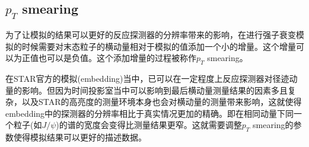 \subsection{ \textbf{$p_T$ smearing} }

为了让模拟的结果可以更好的反应探测器的分辨率带来的影响，在进行强子衰变模拟的时候需要对末态粒子的横动量相对于模拟的值添加一个小的增量。这个增量可以为正值也可以是负值。这个添加增量的过程被称作$p_T$ smearing。

在STAR官方的模拟(embedding)当中，已可以在一定程度上反应探测器对径迹动量的影响。但因为时间投影室当中可以影响到最后横动量测量结果的因素多且复杂，以及STAR的高亮度的测量环境本身也会对横动量的测量带来影响，这就使得embedding中的探测器的分辨率相比于真实情况更加的精确。即在相同动量下同一个粒子(如$J/\psi$)的谱的宽度会变得比测量结果更窄。这就需要调整$p_T$ smearing的参数使得模拟结果可以更好的描述数据。

